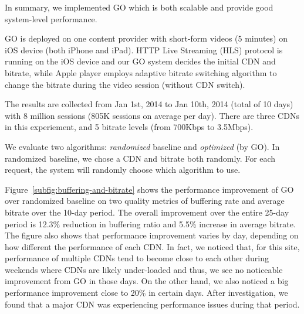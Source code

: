 In summary, we implemented GO which is both scalable and provide good system-level performance.


\label{subsec:eval_setup}

GO is deployed on one content provider with short-form videos (5 minutes) on iOS device (both iPhone and iPad). 
HTTP Live Streaming (HLS) protocol is running on the iOS device and our GO system decides the initial CDN and bitrate, while Apple player employs adaptive 
bitrate switching algorithm to change the bitrate during the video session (without CDN switch). 

The results are collected from Jan 1st, 2014 to Jan 10th, 2014 (total of 10 days) with 8 million sessions (805K sessions on average per day).
There are three CDNs in this experiement, and 5 bitrate levels (from 700Kbps to 3.5Mbps).

We evaluate two algorithms: {\it randomized} baseline and {\it optimized} (by GO). In randomized baseline, we chose a CDN and bitrate both randomly. 
For each request, the system will randomly choose which algorithm to use. 


\label{subsec:real-world-improvement}


Figure~\ref{subfig:buffering-and-bitrate} shows the performance improvement of GO over randomized baseline on two quality metrics of
buffering rate and average bitrate over the 10-day period. The overall improvement over the entire 25-day period is 12.3\% reduction in buffering ratio and 5.5\% increase in 
average bitrate. The figure also shows that performance improvement varies by day, depending on how different the performance of each CDN. 
In fact, we noticed that, for this site, performance of multiple CDNs tend to become close to each other
during weekends where CDNs are likely under-loaded and thus, we see no noticeable improvement from GO in those days. 
On the other hand, we also noticed a big performance improvement close to 20\% in certain days. After investigation,
we found that a major CDN was experiencing performance issues during that period. 

